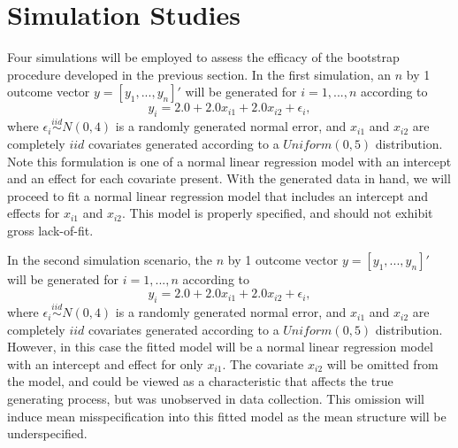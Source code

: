 \documentclass[12pt]{article} %
\theoremstyle{definition}
\begin{document}
\section{Simulation Studies}

Four simulations will be employed to assess the efficacy of the bootstrap procedure developed in the previous section. In the first simulation, an $n$ by 1 outcome vector $y = [y_1,...,y_n]'$ will
be generated for $i = 1,...,n$ according to
\begin{equation*}
	y_i = 2.0 + 2.0 x_{i1} + 2.0 x_{i2} + \epsilon_i , 
\end{equation*}
where $\epsilon_i \stackrel{iid}{\sim} N(0,4)$ is a randomly generated normal error, and $x_{i1}$ and $x_{i2}$ are completely $iid$ covariates generated according to
a $Uniform(0,5)$ distribution. Note this formulation is one of a normal linear regression model with an intercept and an effect for each covariate present. With the generated data in hand, we will
proceed to fit a normal linear regression model that includes an intercept and effects for $x_{i1}$ and $x_{i2}$. This model is properly specified, and should not exhibit gross lack-of-fit.

In the second simulation scenario, the $n$ by 1 outcome vector $y = [y_1,...,y_n]'$ will be generated for $i = 1,...,n$ according to
\begin{equation*}
	y_i = 2.0 + 2.0 x_{i1} + 2.0 x_{i2} + \epsilon_i , 
\end{equation*}
where $\epsilon_i \stackrel{iid}{\sim} N(0,4)$ is a randomly generated normal error, and $x_{i1}$ and $x_{i2}$ are completely $iid$ covariates generated according to
a $Uniform(0,5)$ distribution. However, in this case the fitted model will be a normal linear regression model with an intercept and effect for only
$x_{i1}$. The covariate $x_{i2}$ will be omitted from the model, and could be viewed as a characteristic that affects the true generating process, but
was unobserved in data collection. This omission will induce mean misspecification into this fitted model as the mean structure will be underspecified.
\end{document}

